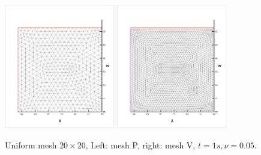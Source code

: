 \documentclass{article}
\begin{document}
 \begin{figure}[ht]
   \centering
   \includegraphics[width = 0.43\textwidth, angle = -90]{./uniform20_meshP.eps}
   \includegraphics[width = 0.43\textwidth, angle = -90]{./uniform20_meshV.eps}
   \caption{\small Uniform mesh $20 \times 20$,
     Left: mesh P, right: mesh V, $t = 1s, \nu = 0.05$.}
   \label{fig::uniform20_mesh}
 \end{figure}
\end{document}
